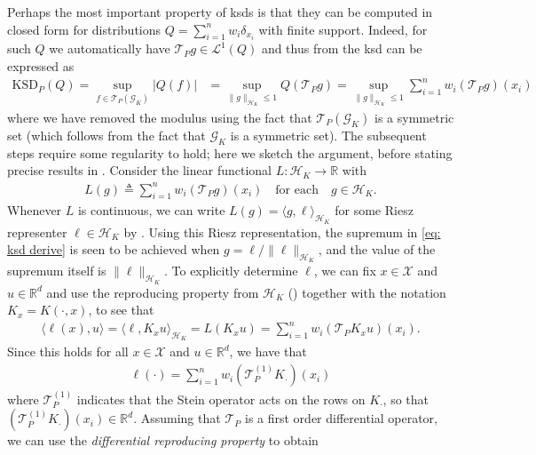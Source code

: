 \documentclass[12pt,paper=letter]{scrreprt}
\newcommand{\qtext}[1]{\quad\text{#1}\quad}
\def\reals{\mathbb{R}} %
\def\defeq{\triangleq} %
\begin{document}
Perhaps the most important property of \acp{ksd} is that they can be computed in closed form for distributions $Q = \sum_{i=1}^n w_i \delta_{x_i}$ with finite support.
Indeed, for such $Q$ we automatically have $\mathcal{T}_P g \in \mathcal{L}^1(Q)$ and thus from  the \ac{ksd} can be expressed as
\begin{align}
    \mathrm{KSD}_P(Q) = \sup_{f \in \mathcal{T}_P (\mathcal{G}_K) } |Q(f)| & = \sup_{\|g\|_{\mathcal{H}_K} \leq 1 } Q(\mathcal{T}_P g)   = \sup_{\|g\|_{\mathcal{H}_K} \leq 1 } \sum_{i=1}^n w_i (\mathcal{T}_P g)(x_i) \label{eq: ksd derive}
\end{align}
where we have removed the modulus using the fact that $\mathcal{T}_P(\mathcal{G}_K)$ is a symmetric set (which follows from the fact that $\mathcal{G}_K$ is a symmetric set).
The subsequent steps require some regularity to hold; here we sketch the argument, before stating precise results in . 
Consider the linear functional $L : \mathcal{H}_K \to \reals$ with 
\begin{align*}
    L(g) \defeq \sum_{i=1}^n w_i (\mathcal{T}_P g)(x_i)
    \qtext{for each}
    g\in\mathcal{H}_K.
\end{align*}
Whenever $L$ is continuous, we can write $L(g) = \langle g , \ell \rangle_{\mathcal{H}_K}$ for some Riesz representer $\ell \in \mathcal{H}_K$ by .
Using this Riesz representation, the supremum in \eqref{eq: ksd derive} is seen to be achieved when $g = \ell / \|\ell\|_{\mathcal{H}_K}$, and the value of the supremum itself is $\|\ell\|_{\mathcal{H}_K}$.
To explicitly determine $\ell$, we can fix $x \in \mathcal{X}$ and $u \in \mathbb{R}^d$ and use the reproducing property from $\mathcal{H}_K$ () together with the notation $K_x = K(\cdot,x)$, to see that
\begin{align*}
    \langle \ell(x) , u \rangle = \langle \ell , K_x u \rangle_{\mathcal{H}_K} = L(K_x u) = \sum_{i=1}^n w_i (\mathcal{T}_P K_x u)(x_i) .
\end{align*}
Since this holds for all $x \in \mathcal{X}$ and $u \in \mathbb{R}^d$, we have that
\begin{align*}
    \ell(\cdot) = \sum_{i=1}^n w_i (\mathcal{T}_P^{(1)} K_{\cdot})(x_i)
\end{align*}
where $\mathcal{T}_P^{(1)}$ indicates that the Stein operator acts on the rows on $K_{\cdot}$, so that $(\mathcal{T}_P^{(1)} K_{\cdot})(x_i) \in \mathbb{R}^d$.
Assuming that $\mathcal{T}_P$ is a first order differential operator, we can use the \emph{differential reproducing property} \citep[Lem.~4]{barp2022targeted} to obtain
\end{document}

